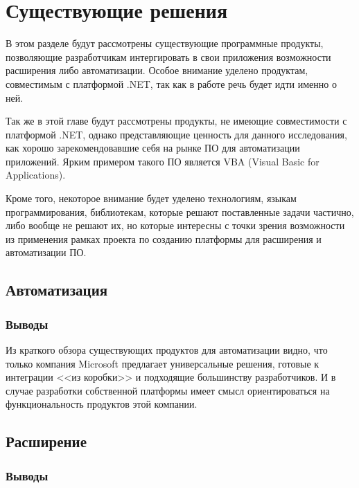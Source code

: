 \section{Существующие решения}

В этом разделе будут рассмотрены существующие программные продукты, позволяющие разработчикам интергировать в свои приложения возможности расширения либо автоматизации. Особое внимание уделено продуктам, совместимым с платформой .NET, так как в работе речь будет идти именно о ней.

Так же в этой главе будут рассмотрены продукты, не имеющие совместимости с платформой .NET, однако представляющие ценность для данного исследования, как хорошо зарекомендовавшие себя на рынке ПО для автоматизации приложений. Ярким примером такого ПО является VBA (Visual Basic for Applications).

Кроме того, некоторое внимание будет уделено технологиям, языкам программирования, библиотекам, которые решают поставленные задачи частично, либо вообще не решают их, но которые интересны с точки зрения возможности из применения рамках проекта по созданию платформы для расширения и автоматизации ПО.

\subsection{Автоматизация}







\subsubsection{Выводы}

Из краткого обзора существующих продуктов для автоматизации видно, что только компания Microsoft предлагает универсальные решения, готовые к интеграции <<из коробки>> и подходящие большинству разработчиков. И в случае разработки собственной платформы имеет смысл ориентироваться на функциональность продуктов этой компании.

\subsection{Расширение}








\subsubsection{Выводы}

